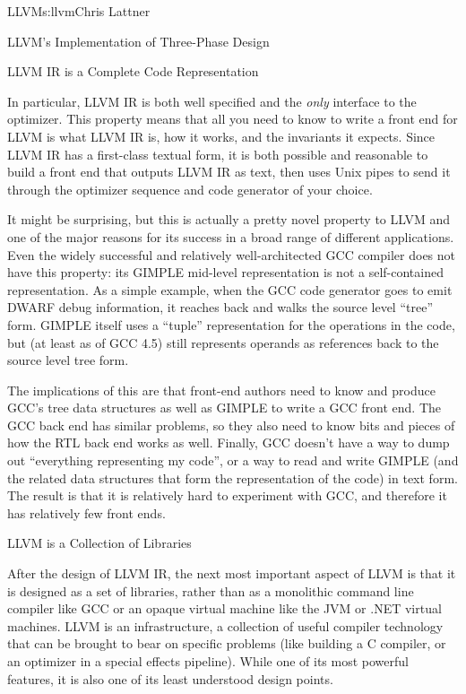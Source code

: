 \begin{aosachapter}{LLVM}{s:llvm}{Chris Lattner}
\begin{aosasect1}{LLVM's Implementation of Three-Phase Design}

\begin{aosasect2}{LLVM IR is a Complete Code Representation}

In particular, LLVM IR is both well specified and the \emph{only}
interface to the optimizer.  This property means that all you need to
know to write a front end for LLVM is what LLVM IR is, how it works,
and the invariants it expects.  Since LLVM IR has a first-class
textual form, it is both possible and reasonable to build a front end
that outputs LLVM IR as text, then uses Unix pipes to send it through
the optimizer sequence and code generator of your choice.

It might be surprising, but this is actually a pretty novel property
to LLVM and one of the major reasons for its success in a broad range
of different applications.  Even the widely successful and relatively
well-architected GCC compiler does not have this property: its GIMPLE
mid-level representation is not a self-contained representation.  As a
simple example, when the GCC code generator goes to emit DWARF debug
information, it reaches back and walks the source level ``tree'' form.
GIMPLE itself uses a ``tuple'' representation for the operations in
the code, but (at least as of GCC 4.5) still represents operands as
references back to the source level tree form.

The implications of this are that front-end authors need to know and
produce GCC's tree data structures as well as GIMPLE to write a GCC
front end.  The GCC back end has similar problems, so they also need to
know bits and pieces of how the RTL back end works as well.  Finally,
GCC doesn't have a way to dump out ``everything representing my
code'', or a way to read and write GIMPLE (and the related data
structures that form the representation of the code) in text form.
The result is that it is relatively hard to experiment with GCC, and
therefore it has relatively few front ends.

\end{aosasect2}

\begin{aosasect2}{LLVM is a Collection of Libraries}

After the design of LLVM IR, the next most important
aspect of LLVM is that it is designed as a set of libraries, rather than as a
monolithic command line compiler like GCC or an opaque virtual machine
like the JVM or .NET virtual machines.  LLVM is an
infrastructure, a collection of useful compiler technology that can be
brought to bear on specific problems (like building a C compiler, or
an optimizer in a special effects pipeline).  While one of its most
powerful features, it is also one of its least understood design
points.


\end{aosasect2}
\end{aosasect1}
\end{aosachapter}
